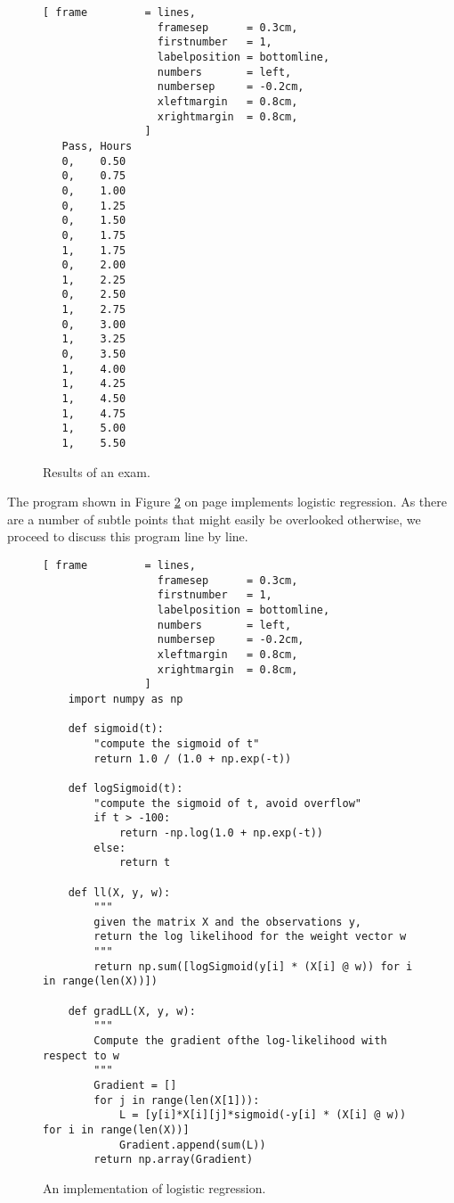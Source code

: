 \begin{figure}[!ht]
\centering
\begin{Verbatim}[ frame         = lines, 
                  framesep      = 0.3cm, 
                  firstnumber   = 1,
                  labelposition = bottomline,
                  numbers       = left,
                  numbersep     = -0.2cm,
                  xleftmargin   = 0.8cm,
                  xrightmargin  = 0.8cm,
                ]
   Pass, Hours
   0,    0.50
   0,    0.75
   0,    1.00
   0,    1.25
   0,    1.50
   0,    1.75
   1,    1.75
   0,    2.00
   1,    2.25
   0,    2.50
   1,    2.75
   0,    3.00
   1,    3.25
   0,    3.50
   1,    4.00
   1,    4.25
   1,    4.50
   1,    4.75
   1,    5.00
   1,    5.50
\end{Verbatim}
\vspace*{-0.3cm}
\caption{Results of an exam.}
\label{fig:exam.csv}
\end{figure}

The program shown in Figure \ref{fig:logistic_regression.py} on page
\pageref{fig:logistic_regression.py} implements logistic regression.  As there are a number of
subtle points that might easily be overlooked otherwise, we proceed to discuss this program line by line. 


\begin{figure}[!ht]
\centering
\begin{Verbatim}[ frame         = lines, 
                  framesep      = 0.3cm, 
                  firstnumber   = 1,
                  labelposition = bottomline,
                  numbers       = left,
                  numbersep     = -0.2cm,
                  xleftmargin   = 0.8cm,
                  xrightmargin  = 0.8cm,
                ]
    import numpy as np
    
    def sigmoid(t):
        "compute the sigmoid of t"
        return 1.0 / (1.0 + np.exp(-t))
    
    def logSigmoid(t):
        "compute the sigmoid of t, avoid overflow"
        if t > -100:
            return -np.log(1.0 + np.exp(-t))
        else:
            return t
    
    def ll(X, y, w):
        """
        given the matrix X and the observations y,
        return the log likelihood for the weight vector w
        """
        return np.sum([logSigmoid(y[i] * (X[i] @ w)) for i in range(len(X))])
    
    def gradLL(X, y, w):
        """
        Compute the gradient ofthe log-likelihood with respect to w 
        """
        Gradient = []
        for j in range(len(X[1])):
            L = [y[i]*X[i][j]*sigmoid(-y[i] * (X[i] @ w)) for i in range(len(X))]
            Gradient.append(sum(L))
        return np.array(Gradient)
\end{Verbatim}
\vspace*{-0.3cm}
\caption{An implementation of logistic regression.}
\label{fig:logistic_regression.py}
\end{figure}



